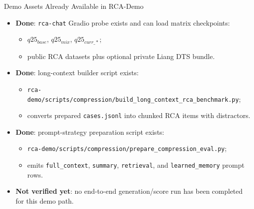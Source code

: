 \begin{frame}{Demo Assets Already Available in RCA-Demo}
  \begin{itemize}
    \item \textbf{Done}: \texttt{rca-chat} Gradio probe exists and can load matrix checkpoints:
      \begin{itemize}
        \item $q25_{base}$, $q25_{mix}$, $q25_{curr\_*}$;
        \item public RCA datasets plus optional private Liang DTS bundle.
      \end{itemize}
    \item \textbf{Done}: long-context builder script exists:
      \begin{itemize}
        \item \texttt{rca-demo/scripts/compression/build\_long\_context\_rca\_benchmark.py};
        \item converts prepared \texttt{cases.jsonl} into chunked RCA items with distractors.
      \end{itemize}
    \item \textbf{Done}: prompt-strategy preparation script exists:
      \begin{itemize}
        \item \texttt{rca-demo/scripts/compression/prepare\_compression\_eval.py};
        \item emits \texttt{full\_context}, \texttt{summary}, \texttt{retrieval}, and \texttt{learned\_memory} prompt rows.
      \end{itemize}
    \item \textbf{Not verified yet}: no end-to-end generation/score run has been completed for this demo path.
  \end{itemize}
\end{frame}


